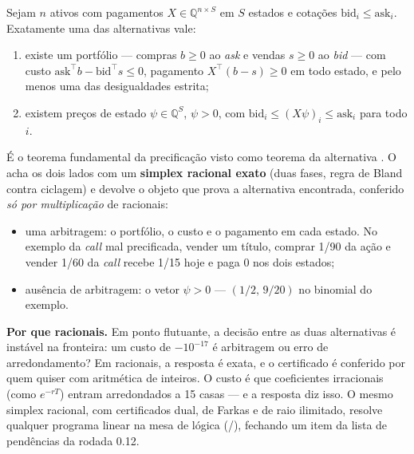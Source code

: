 \begin{proposicao}\label{prop:farkas}
Sejam $n$ ativos com pagamentos $X \in \mathbb{Q}^{n \times S}$ em $S$ estados e cotações $\mathrm{bid}_i \leq \mathrm{ask}_i$. Exatamente uma das alternativas vale:
\begin{enumerate}
  \item existe um portfólio --- compras $b \geq 0$ ao \textit{ask} e vendas $s \geq 0$ ao \textit{bid} --- com custo $\mathrm{ask}^\top b - \mathrm{bid}^\top s \leq 0$, pagamento $X^\top(b - s) \geq 0$ em todo estado, e pelo menos uma das desigualdades estrita;
  \item existem preços de estado $\psi \in \mathbb{Q}^S$, $\psi > 0$, com $\mathrm{bid}_i \leq (X\psi)_i \leq \mathrm{ask}_i$ para todo $i$.
\end{enumerate}
\end{proposicao}

É o teorema fundamental da precificação \cite{harrison1979,jouini1995} visto como teorema da alternativa \cite{farkas1902}. O \vapor{} acha os dois lados com um \textbf{simplex racional exato} (duas fases, regra de Bland contra ciclagem) e devolve o objeto que prova a alternativa encontrada, conferido \emph{só por multiplicação} de racionais:
\begin{itemize}
  \item uma arbitragem: o portfólio, o custo e o pagamento em cada estado. No exemplo da \textit{call} mal precificada, vender um título, comprar 1/90 da ação e vender 1/60 da \textit{call} recebe 1/15 hoje e paga 0 nos dois estados;
  \item ausência de arbitragem: o vetor $\psi > 0$ --- $(1/2,\, 9/20)$ no binomial do exemplo.
\end{itemize}

\begin{mestrado}
\textbf{Por que racionais.} Em ponto flutuante, a decisão entre as duas alternativas é instável na fronteira: um custo de $-10^{-17}$ é arbitragem ou erro de arredondamento? Em racionais, a resposta é exata, e o certificado é conferido por quem quiser com aritmética de inteiros. O custo é que coeficientes irracionais (como $e^{-rT}$) entram arredondados a 15 casas --- e a resposta diz isso. O mesmo simplex racional, com certificados dual, de Farkas e de raio ilimitado, resolve qualquer programa linear na mesa de lógica (/), fechando um item da lista de pendências da rodada 0.12.
\end{mestrado}

